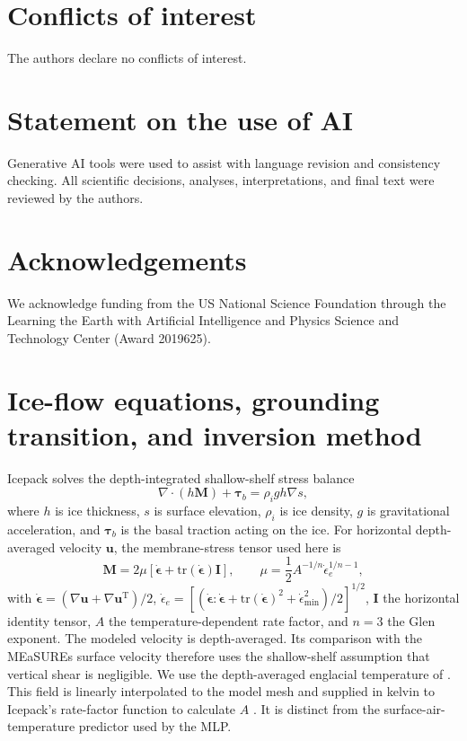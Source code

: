 \documentclass[review,jog]{igs}
\begin{document}
\section*{Conflicts of interest}
The authors declare no conflicts of interest.

\section*{Statement on the use of AI}
Generative AI tools were used to assist with language revision and consistency checking. All scientific decisions, analyses, interpretations, and final text were reviewed by the authors.

\section*{Acknowledgements}
We acknowledge funding from the US National Science Foundation through the Learning the Earth with Artificial Intelligence and Physics Science and Technology Center (Award 2019625).




\appendix

\section{Ice-flow equations, grounding transition, and inversion method}
\label{app:ssa}

Icepack solves the depth-integrated shallow-shelf stress balance
\begin{equation}
\label{eq:ssa_tensor}
\nabla\!\cdot\!\left(h\mathbf{M}\right)+\boldsymbol{\tau}_b
=\rho_i g h\nabla s,
\end{equation}
where $h$ is ice thickness, $s$ is surface elevation, $\rho_i$ is ice
density, $g$ is gravitational acceleration, and $\boldsymbol{\tau}_b$ is
the basal traction acting on the ice. For horizontal depth-averaged velocity $\mathbf{u}$, the membrane-stress tensor used here is
\begin{equation}
\label{eq:membrane_stress}
\mathbf{M}=2\mu\left[\dot{\boldsymbol{\epsilon}}
+\mathrm{tr}(\dot{\boldsymbol{\epsilon}})\mathbf{I}\right],\qquad
\mu=\frac{1}{2}A^{-1/n}\dot{\epsilon}_e^{1/n-1},
\end{equation}
with $\dot{\boldsymbol{\epsilon}}=
(\nabla\mathbf{u}+\nabla\mathbf{u}^{\mathrm T})/2$,
$\dot{\epsilon}_e=\left[(\dot{\boldsymbol{\epsilon}}:
\dot{\boldsymbol{\epsilon}}+\mathrm{tr}(\dot{\boldsymbol{\epsilon}})^2
+\dot{\epsilon}_{\min}^2)/2\right]^{1/2}$, $\mathbf{I}$ the horizontal
identity tensor, $A$ the temperature-dependent rate factor, and $n=3$ the
Glen exponent. The modeled velocity is depth-averaged. Its comparison with
the MEaSUREs surface velocity therefore uses the shallow-shelf assumption
that vertical shear is negligible. We use the depth-averaged englacial temperature of
\citet{van2013using}. This field is linearly interpolated
to the model mesh and supplied in kelvin to Icepack's rate-factor
function to calculate $A$ \citep{shapero2021icepack}. It is distinct
from the surface-air-temperature predictor used by the MLP.
\end{document}
